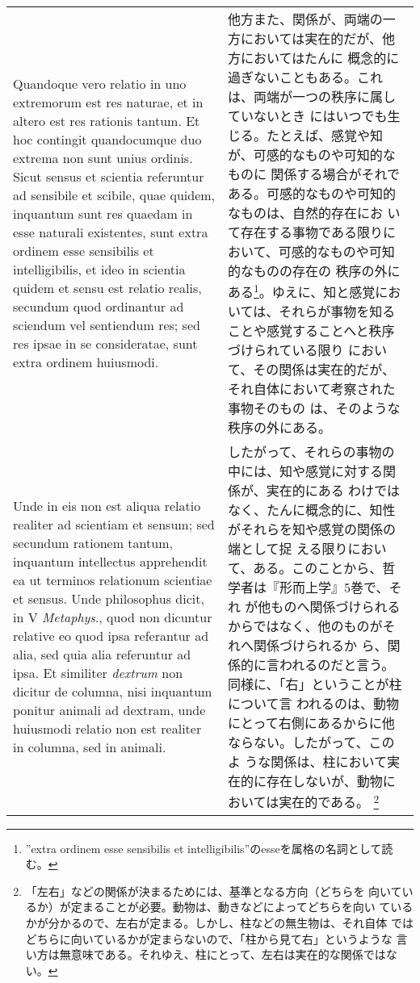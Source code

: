 \documentclass[10pt]{jsarticle}
\begin{document}
\begin{longtable}{p{21em}p{21em}}
\\

Quandoque vero relatio in uno extremorum est res naturae, et in altero
est res rationis tantum. Et hoc contingit quandocumque duo extrema non
sunt unius ordinis. Sicut sensus et scientia referuntur ad sensibile
et scibile, quae quidem, inquantum sunt res quaedam in esse naturali
existentes, sunt extra ordinem esse sensibilis et intelligibilis, et
ideo in scientia quidem et sensu est relatio realis, secundum quod
ordinantur ad sciendum vel sentiendum res; sed res ipsae in se
consideratae, sunt extra ordinem huiusmodi.

&

他方また、関係が、両端の一方においては実在的だが、他方においてはたんに
概念的に過ぎないこともある。これは、両端が一つの秩序に属していないとき
にはいつでも生じる。たとえば、感覚や知が、可感的なものや可知的なものに
関係する場合がそれである。可感的なものや可知的なものは、自然的存在にお
いて存在する事物である限りにおいて、可感的なものや可知的なものの存在の
秩序の外にある\footnote{''extra ordinem esse sensibilis et
intelligibilis''のesseを属格の名詞として読む。}。ゆえに、知と感覚にお
いては、それらが事物を知ることや感覚することへと秩序づけられている限り
において、その関係は実在的だが、それ自体において考察された事物そのもの
は、そのような秩序の外にある。

\\

Unde in eis non est aliqua relatio realiter ad scientiam et sensum;
sed secundum rationem tantum, inquantum intellectus apprehendit ea ut
terminos relationum scientiae et sensus. Unde philosophus dicit, in V
{\itshape Metaphys}., quod non dicuntur relative eo quod ipsa
referantur ad alia, sed quia alia referuntur ad ipsa. Et similiter
{\itshape dextrum} non dicitur de columna, nisi inquantum ponitur
animali ad dextram, unde huiusmodi relatio non est realiter in
columna, sed in animali.

&

したがって、それらの事物の中には、知や感覚に対する関係が、実在的にある
わけではなく、たんに概念的に、知性がそれらを知や感覚の関係の端として捉
える限りにおいて、ある。このことから、哲学者は『形而上学』5巻で、それ
が他ものへ関係づけられるからではなく、他のものがそれへ関係づけられるか
ら、関係的に言われるのだと言う。同様に、「右」ということが柱について言
われるのは、動物にとって右側にあるからに他ならない。したがって、このよ
うな関係は、柱において実在的に存在しないが、動物においては実在的である。
\footnote{「左右」などの関係が決まるためには、基準となる方向（どちらを
向いているか）が定まることが必要。動物は、動きなどによってどちらを向い
ているかが分かるので、左右が定まる。しかし、柱などの無生物は、それ自体
ではどちらに向いているかが定まらないので、「柱から見て右」というような
言い方は無意味である。それゆえ、柱にとって、左右は実在的な関係ではない。}


\end{longtable}
\end{document}
